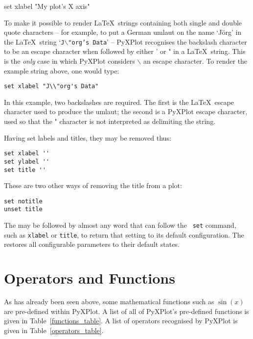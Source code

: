 \begin{dodo}
set xlabel "My plot's X axis"
\end{dodo}

To make it possible to render \LaTeX\ strings containing both single and double
quote characters -- for example, to put a German umlaut on the name `J\"org' in
the \LaTeX\ string `{\tt J$\backslash$"org's Data}' -- PyXPlot recognises
the backslash character to be an escape character when followed by either ' or
" in a \LaTeX\ string. This is the \textit{only} case in which PyXPlot
considers $\backslash$ an escape character. To render the example string above,
one would type:

\begin{verbatim}
set xlabel "J\\"org's Data"
\end{verbatim}

\noindent In this example, two backslashes are required.  The first is the
\LaTeX\ escape character used to produce the umlaut; the second is a PyXPlot
escape character, used so that the " character is not interpreted as
delimiting the string. 

Having set labels and titles, they may be removed thus:

\begin{verbatim}
set xlabel ''
set ylabel ''
set title ''
\end{verbatim}

\noindent These are two other ways of removing the title from a plot:

\begin{verbatim}
set notitle
unset title
\end{verbatim}

The  may be followed by almost any word that can follow the {\tt
set} command, such as {\tt xlabel} or {\tt title}, to return that setting to
its default configuration. The  restores all configurable
parameters to their default states.

\section{Operators and Functions}

As has already been seen above, some mathematical functions such as $\sin(x)$
are pre-defined within PyXPlot. A list of all of PyXPlot's pre-defined
functions is given in Table~\ref{functions_table}. A list of operators
recognised by PyXPlot is given in
Table~\ref{operators_table}.

